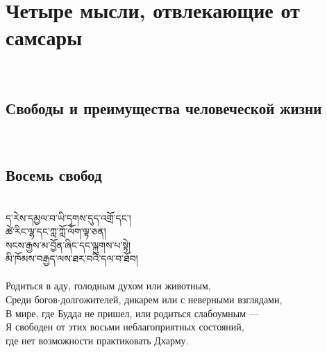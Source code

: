 \newpage
\section{Четыре мысли, отвлекающие от самсары}
\\
\subsection{Свободы и преимущества человеческой жизни}
\\
\subsection*{Восемь свобод}
\\
\ti
ད་རེས་དམྱལ་བ་ཡི་དྭགས་དུད་འགྲོ་དང༌།\\
ཚེ་རིང་ལྷ་དང་ཀླ་ཀློ་ལོག་ལྟ་ཅན།\\
སངས་རྒྱས་མ་བྱོན་ཞིང་དང་ལྐུགས་པ་སྟེ།\\
མི་ཁོམས་བརྒྱད་ལས་ཐར་བའི་དལ་བ་ཐོབ།\\
\\
\ru
Родиться в аду, голодным духом или животным,\\
Среди богов-долгожителей, дикарем или с неверными взглядами,\\
В мире, где Будда не пришел, или родиться слабоумным —\\
Я свободен от этих восьми неблагоприятных состояний,\\
\indent где нет возможности практиковать Дхарму.\\

\newpage
